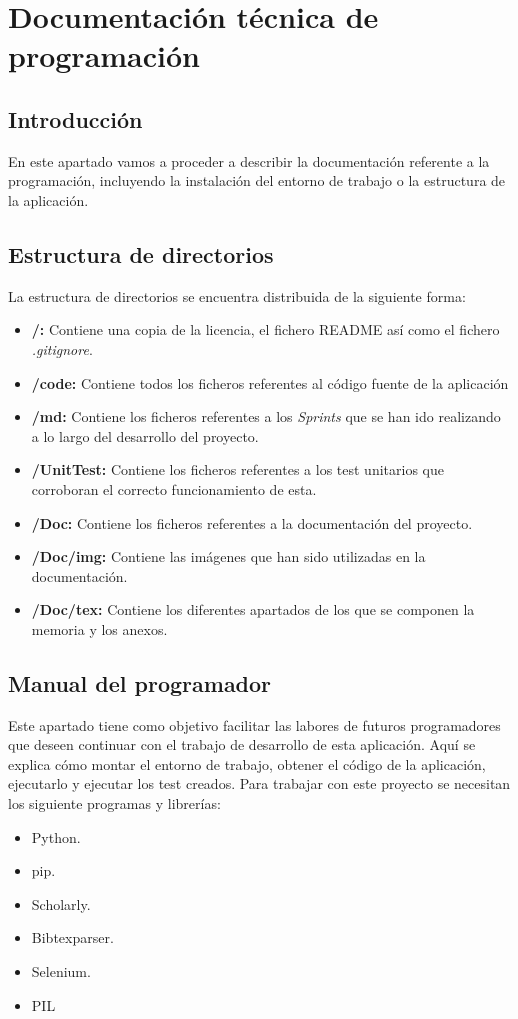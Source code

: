 \chapter[Documentación de programación]{Documentación técnica de programación}

\section{Introducción}
En este apartado vamos a proceder a describir la documentación referente a la programación, incluyendo la instalación del entorno de trabajo o la estructura de la aplicación.

\section{Estructura de directorios}
La estructura de directorios se encuentra distribuida de la siguiente forma:
\begin{itemize}
	\item \textbf{/:} Contiene una copia de la licencia, el fichero README así como el fichero \emph{.gitignore}.
	\item \textbf{/code:} Contiene todos los ficheros referentes al código fuente de la aplicación
	\item \textbf{/md:} Contiene los ficheros referentes a los \emph{Sprints} que se han ido realizando a lo largo del desarrollo del proyecto.
	\item \textbf{/UnitTest:} Contiene los ficheros referentes a los test unitarios que corroboran el correcto funcionamiento de esta.
	\item \textbf{/Doc:} Contiene los ficheros referentes a la documentación del proyecto.
	\item \textbf{/Doc/img:} Contiene las imágenes que han sido utilizadas en la documentación.
	\item \textbf{/Doc/tex:} Contiene los diferentes apartados de los que se componen la memoria y los anexos.
\end{itemize}

\section{Manual del programador}\label{instalar}
Este apartado tiene como objetivo facilitar las labores de futuros programadores que deseen continuar con el trabajo de desarrollo de esta aplicación. Aquí se explica cómo montar el entorno de trabajo, obtener el código de la aplicación, ejecutarlo y ejecutar los test creados.
Para trabajar con este proyecto se necesitan los siguiente programas y librerías:
\begin{itemize}
	\item Python.
	\item pip.
	\item Scholarly.
	\item Bibtexparser.
	\item Selenium.
	\item PIL
\end{itemize}
